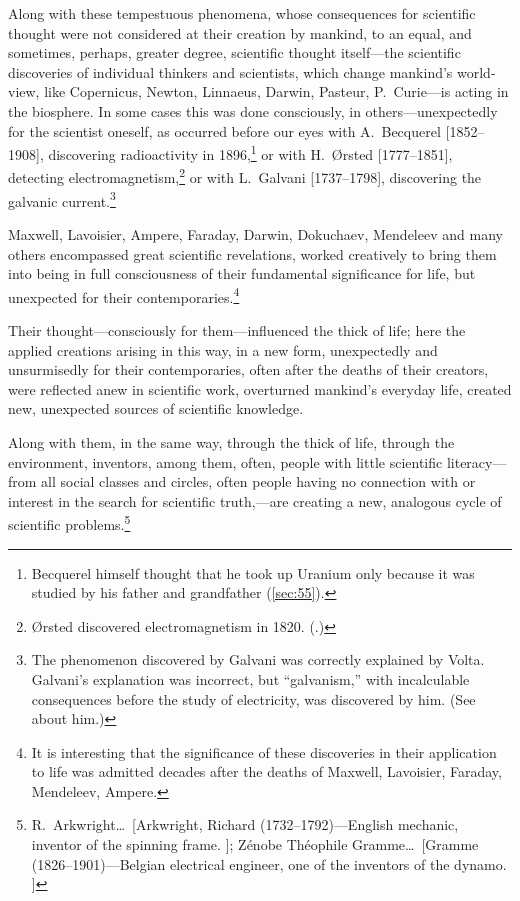 Along with these tempestuous phenomena, whose consequences for scientific
thought were not considered at their creation by mankind, to an equal, and
sometimes, perhaps, greater degree, scientific thought itself---the scientific
discoveries of individual thinkers and scientists, which change mankind's
world-view, like Copernicus, Newton, Linnaeus, Darwin, Pasteur, P.\ Curie---is
acting in the biosphere.  In some cases this was done consciously, in
others---unexpectedly for the scientist oneself, as occurred before our
eyes with A.\ Becquerel [1852--1908], discovering radioactivity in
1896,\footnote{%
	Becquerel himself thought that he took up Uranium only because it was
	studied by his father and grandfather (\autoref{sec:55}).
} or with H.\ Ørsted [1777--1851], detecting electromagnetism,\footnote{%
	Ørsted discovered electromagnetism in 1820.
	(\cite{oersted1920discovery}.)
} or with L.\ Galvani [1737--1798], discovering the galvanic
current.\footnote{%
	The phenomenon discovered by Galvani was correctly explained by Volta.
	Galvani's explanation was incorrect, but ``galvanism,'' with
	incalculable consequences before the study of electricity, was
	discovered by him.  (See \cite{alibert1801eloge} about him.)
}

Maxwell, Lavoisier, Ampere, Faraday, Darwin, Dokuchaev, Mendeleev and many
others encompassed great scientific revelations, worked creatively to bring
them into being in full consciousness of their fundamental significance for
life, but unexpected for their contemporaries.\footnote{%
	It is interesting that the significance of these discoveries in their
	application to life was admitted decades after the deaths of Maxwell,
	Lavoisier, Faraday, Mendeleev,  Ampere.
}

Their thought---consciously for them---influenced the thick of life; here the
applied creations arising in this way, in a new form, unexpectedly and
unsurmisedly for their contemporaries, often after the deaths of their
creators, were reflected anew in scientific work, overturned mankind's everyday
life,  created new, unexpected sources of scientific
knowledge.

Along with them, in the same way, through the thick of life, through the
environment, inventors, among them, often, people with little scientific
literacy---from all social classes and circles, often people having no
connection with or interest in the search for scientific truth,---are creating
a new, analogous cycle of scientific problems.\footnote{%
	R.\ Arkwright\dots\ [Arkwright, Richard (1732--1792)---English
	mechanic, inventor of the spinning frame. ]; Zénobe
	Théophile Gramme\dots\ [Gramme (1826--1901)---Belgian electrical
	engineer, one of the inventors of the dynamo. ]
}


